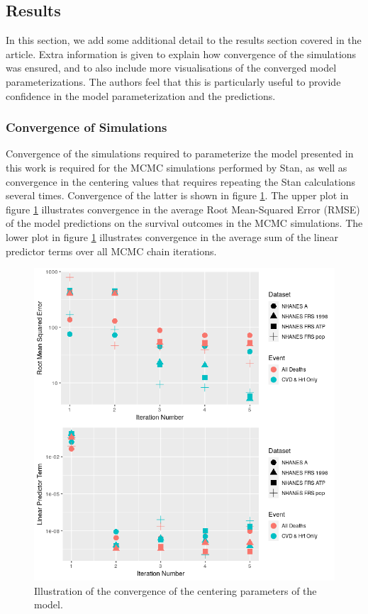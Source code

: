 \documentclass[
]{article}
\begin{document}
\hypertarget{results}{%
\subsection{Results}\label{results}}

In this section, we add some additional detail to the results section covered in the article. Extra information is given to explain how convergence of the simulations was ensured, and to also include more visualisations of the converged model parameterizations. The authors feel that this is particularly useful to provide confidence in the model parameterization and the predictions.

\hypertarget{convergence-of-simulations}{%
\subsubsection{Convergence of Simulations}\label{convergence-of-simulations}}

Convergence of the simulations required to parameterize the model presented in this work is required for the MCMC simulations performed by Stan, as well as convergence in the centering values that requires repeating the Stan calculations several times. Convergence of the latter is shown in figure \ref{fig:linpred_conv}. The upper plot in figure \ref{fig:linpred_conv} illustrates convergence in the average Root Mean-Squared Error (RMSE) of the model predictions on the survival outcomes in the MCMC simulations. The lower plot in figure \ref{fig:linpred_conv} illustrates convergence in the average sum of the linear predictor terms over all MCMC chain iterations.

\begin{figure}
\hypertarget{fig:linpred_conv}{%
\centering
\includegraphics{./Rmarkdown_Plots/RMSE-Linpred_Convergence.png}
\caption{Illustration of the convergence of the centering parameters of the model.}\label{fig:linpred_conv}
}
\end{figure}
\end{document}
